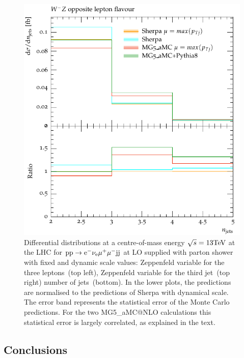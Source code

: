 \documentclass[11pt]{cernrep}
\makeatletter
\newcommand{\MGaMC}{M\protect\scalebox{0.8}{AD}G\protect\scalebox{0.8}{RAPH}5\_aMC@NLO\xspace}
\makeatother
\begin{document}
\begin{figure}[htbp]
\begin{center}
   \includegraphics[scale=0.65]{figs/dyn_WmZ_OF_nJets}
\caption{Differential distributions at a centre-of-mass energy $\sqrt{s}=13{\rm TeV}$ at the LHC for ${\rm p} {\rm p} \to {\rm e}^-  \nu_{\rm e}  \mu^+ \mu^- {\rm j} {\rm j}$ at LO supplied with parton shower with fixed and dynamic scale values: 
                Zeppenfeld variable for the three leptons~(top left),
                Zeppenfeld variable for the third jet~(top right)
                number of jets~(bottom).
                In the lower plots, the predictions are normalised to the predictions of {\sc Sherpa} with dynamical scale. The error band represents
                the statistical error of the Monte Carlo predictions. For the two \MGaMC
                calculations this statistical error is largely correlated, as explained in the text.}
\label{vbs_fig_shower_2b}
\end{center}
\end{figure}

\subsection{Conclusions \label{vbs_concl}}
\end{document}
